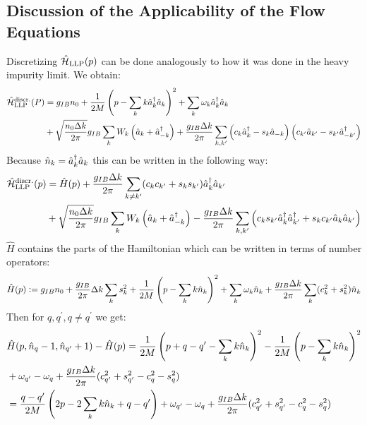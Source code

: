 \subsection{Discussion of the Applicability of the Flow Equations}
Discretizing $\hat{\mathcal{H}}_{\mathrm{LLP}}(p)$ can be done analogously to how it was done in the heavy impurity limit. We obtain:
\begin{align}
\hat{\mathcal{H}}_{\mathrm{LLP}}^{\mathrm{discr.}}(P) &=g_{IB}n_0+\frac{1}{2M}\left(p-\sum\limits_k k \hat a^\dagger_k\hat a_k \right)^2+\sum\limits_k\omega_{ k}\hat a^\dagger_{ k}\hat a_{ k}\nonumber\\
&+\sqrt{\frac{n_0\Delta k}{2\pi}}g_{IB}\sum\limits_k W_k \left(\hat a_{ k}+\hat a^\dagger_{- k}\right) + \frac{g_{IB}\Delta k}{2\pi}\sum\limits_{k,k^\prime} \left(c_k\hat a^\dagger_k-s_k\hat a_{-k}\right)\left(c_{k^\prime}\hat a_{k^\prime}-s_{k^\prime}\hat a^\dagger_{-k^\prime}\right)
\end{align}
Because $\hat n_k=\hat a^\dagger_k\hat a_k$ this can be written in the following way:
\begin{align}
\hat{\mathcal{H}}_{\mathrm{LLP}}^{\mathrm{discr.}}(p) &=\hat H(p)+ \frac{g_{IB}\Delta k}{2\pi}\sum\limits_{k\neq k^\prime}(c_kc_{k^\prime}+s_ks_{k^\prime})\hat a^\dagger_k\hat a_{k^\prime}\nonumber\\
&+\sqrt{\frac{n_0\Delta k}{2\pi}}g_{IB}\sum\limits_k W_k \left(\hat a_{ k}+\hat a^\dagger_{- k}\right) - \frac{g_{IB}\Delta k}{2\pi}\sum\limits_{k,k^\prime} \left(c_ks_{k^\prime}\hat a^\dagger_k\hat a^\dagger_{k^\prime}+s_kc_{k^\prime}\hat a_{k}\hat a_{k^\prime}\right)
\end{align}
$\hat H$ contains the parts of the Hamiltonian which can be written in terms of number operators:
\begin{equation}
\hat H(p)\vcentcolon= g_{IB}n_0+\frac{g_{IB}}{2\pi}\Delta k\sum\limits_{k}s_k^2+\frac{1}{2M}\left(p-\sum\limits_k k \hat n_k \right)^2+\sum\limits_k\omega_{ k}\hat n_k+ \frac{g_{IB}\Delta k}{2\pi}\sum\limits_{k}(c_k^2+s_k^2)\hat n_k
\end{equation}
Then for $q,q^\prime,q\neq q^\prime$ we get:
\begin{align}\label{n_test_eq_thinking}
&\hat H(p,\hat n_q-1,\hat n_{q^\prime}+1)-\hat H(p)=\frac{1}{2M}\left(p+q-q^\prime-\sum\limits_k k \hat n_k \right)^2-\frac{1}{2M}\left(p-\sum\limits_k k \hat n_k \right)^2\nonumber \\
&+\omega_{q^\prime}-\omega_q + \frac{g_{IB}\Delta k}{2\pi}(c_{q^\prime}^2+s_{q^\prime}^2-c_{q}^2-s_{q}^2) \\
&=\frac{q-q^\prime}{2M}\left(2p-2\sum\limits_k k \hat n_k+q-q^\prime\right)+\omega_{q^\prime}-\omega_q + \frac{g_{IB}\Delta k}{2\pi}(c_{q^\prime}^2+s_{q^\prime}^2-c_{q}^2-s_{q}^2) \label{dangerous_maths}
\end{align}
